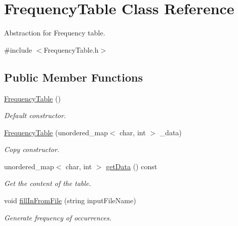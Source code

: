 \hypertarget{class_frequency_table}{}\section{Frequency\+Table Class Reference}
\label{class_frequency_table}


Abstraction for Frequency table.  




{\ttfamily \#include $<$Frequency\+Table.\+h$>$}

\subsection*{Public Member Functions}
\begin{DoxyCompactItemize}
\item 
\mbox{\label{class_frequency_table_aa65fd27208994174a3ff6c692fe51ddb}} 
\mbox{\hyperlink{class_frequency_table_aa65fd27208994174a3ff6c692fe51ddb}{Frequency\+Table}} ()
\begin{DoxyCompactList}\small\item\em Default constructor. \end{DoxyCompactList}\item 
\mbox{\label{class_frequency_table_a7017bb4b9594bb6a8ad9ee5d969d0bd8}} 
\mbox{\hyperlink{class_frequency_table_a7017bb4b9594bb6a8ad9ee5d969d0bd8}{Frequency\+Table}} (unordered\+\_\+map$<$ char, int $>$ \+\_\+data)
\begin{DoxyCompactList}\small\item\em Copy constructor. \end{DoxyCompactList}\item 
unordered\+\_\+map$<$ char, int $>$ \mbox{\hyperlink{class_frequency_table_a02fd0379aafe9f2028637b86ed8301e8}{get\+Data}} () const
\begin{DoxyCompactList}\small\item\em Get the content of the table. \end{DoxyCompactList}\item 
void \mbox{\hyperlink{class_frequency_table_ad556d8ff9846ff76eb3cce00d69ea67a}{fill\+In\+From\+File}} (string input\+File\+Name)
\begin{DoxyCompactList}\small\item\em Generate frequency of occurrences. \end{DoxyCompactList}\item 

\end{DoxyCompactItemize}
